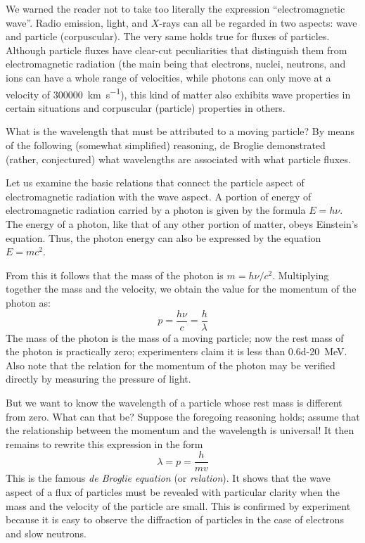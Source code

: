 We warned the reader not to take too literally the expression ``electromagnetic wave''. Radio emission, light, and $X$-rays can all be regarded in two aspects: wave and particle (corpuscular). The very same holds true for fluxes of particles. Although particle fluxes have clear-cut peculiarities that distinguish them from electromagnetic radiation (the main being that electrons, nuclei, neutrons, and ions can have a whole range of velocities, while photons can only move at a velocity of \SI{300000}{\kilo\meter\per\second}), this kind of matter also exhibits wave properties in cer­tain situations and corpuscular (particle) properties in others.

What is the wavelength that must be attributed to a moving particle? By means of the following (somewhat simplified) reasoning, de Broglie demonstrated (rather, conjectured) what wavelengths are associated with what particle fluxes.

Let us examine the basic relations that connect the particle aspect of electromagnetic radiation with the wave aspect. A portion of energy of electromagnetic radiation carried by a photon is given by the formula $E=h\nu$. The energy of a photon, like that of any other portion of matter, obeys Einstein's equation. Thus, the photon energy can also be expressed by the equation $E=mc^{2}$. 


From this it follows that the mass of the photon is $m=h\nu/c^{2}$. Multiplying together the mass and the velocity, we obtain the value for the momentum of the photon as:
\begin{equation*}%
p = \frac{h \nu}{c} = \frac{h}{\lambda}
\end{equation*}
The mass of the photon is the mass of a moving particle; now the rest mass of the photon is practically zero; experimenters claim it is less than \SI{0.6d-20}{\mega\electronvolt}. Also note that the relation for the momentum of the photon may be veri­fied directly by measuring the pressure of light.

But we want to know the wavelength of a particle whose rest mass is different from zero. What can that be? Suppose the foregoing reasoning holds; assume that the relationship between the momentum and the wavelength is universal! It then remains to rewrite this ex­pression in the form
\begin{equation*}%
\lambda = p = \frac{h}{mv}
\end{equation*}\label{de-broglie-equation}
This is the famous \emph{de Broglie equation} (or \emph{relation}). It shows that the wave aspect of a flux of particles must be revealed with particular clarity when the mass and the velocity of the particle are small. This is confirmed by experiment because it is easy to observe the diffraction of particles in the case of electrons and slow neutrons.

